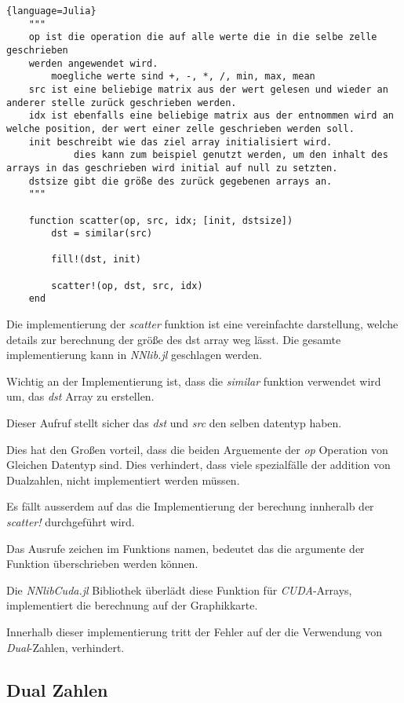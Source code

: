 \begin{lstlisting}{language=Julia}
	"""
	op ist die operation die auf alle werte die in die selbe zelle geschrieben 
	werden angewendet wird.
		moegliche werte sind +, -, *, /, min, max, mean
	src ist eine beliebige matrix aus der wert gelesen und wieder an anderer stelle zurück geschrieben werden.
	idx ist ebenfalls eine beliebige matrix aus der entnommen wird an welche position, der wert einer zelle geschrieben werden soll.
	init beschreibt wie das ziel array initialisiert wird.
			dies kann zum beispiel genutzt werden, um den inhalt des arrays in das geschrieben wird initial auf null zu setzten.
	dstsize gibt die größe des zurück gegebenen arrays an.
	"""

	function scatter(op, src, idx; [init, dstsize])
		dst = similar(src)
		
		fill!(dst, init)
		
		scatter!(op, dst, src, idx)
	end
\end{lstlisting}

Die implementierung der \textit{scatter} funktion ist eine vereinfachte darstellung, 
welche details zur berechnung der größe des dst array weg lässt.
Die gesamte implementierung kann in \textit{NNlib.jl} \cite{} geschlagen werden.

Wichtig an der Implementierung ist, dass die \textit{similar} funktion verwendet wird um, das
\textit{dst} Array zu erstellen.

Dieser Aufruf stellt sicher das \textit{dst} und \textit{src} den selben datentyp haben.

Dies hat den Großen vorteil, 
dass die beiden Arguemente der \textit{op} Operation von Gleichen Datentyp sind. 
Dies verhindert, 
dass viele spezialfälle der addition von Dualzahlen, nicht implementiert werden müssen.

Es fällt ausserdem auf das die Implementierung der berechung innheralb der \textit{scatter!}
durchgeführt wird.


Das Ausrufe zeichen im Funktions namen, bedeutet das die argumente der Funktion überschrieben werden können.


Die \textit{NNlibCuda.jl} Bibliothek überlädt diese Funktion für \textit{CUDA}-Arrays,
implementiert die berechnung auf der Graphikkarte.

Innerhalb dieser implementierung tritt der Fehler auf der die Verwendung von \textit{Dual}-Zahlen,
verhindert.
	
\subsection{Dual Zahlen}

